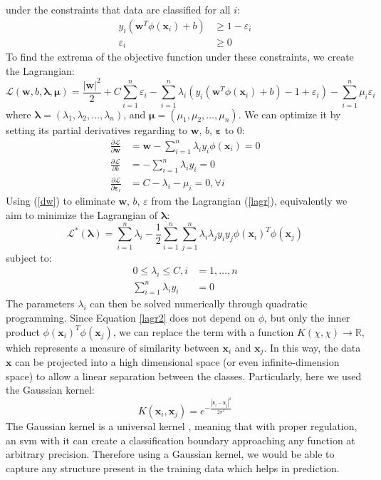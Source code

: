 under the constraints that data are classified for all $i$:
\begin{align*}
    y_i (\mathbf{w}^T\phi(\mathbf{x}_i) + b) &\geq 1 - \varepsilon_i \\ 
    \varepsilon_i &\geq 0
\end{align*}
To find the extrema of the objective function under these constraints, we create the Lagrangian:
\begin{equation} \label{lagr}
    \mathcal{L}(\mathbf{w}, b, \mathbf{\lambda}, \mathbf{\mu})=\frac{|\mathbf{w}|^2}{2} + C\sum_{i=1}^n\varepsilon_i - \sum_{i=1}^n \lambda_i(y_i(\mathbf{w}^T\phi(\mathbf{x}_i) + b) - 1 + \varepsilon_i) - \sum_{i=1}^n \mu_i\varepsilon_i
\end{equation}
where $\mathbf{\lambda}=(\lambda_1, \lambda_2, \ldots, \lambda_n)$, and $\mathbf{\mu}=(\mu_1, \mu_2, \ldots, \mu_n)$. We can optimize it by setting its partial derivatives regarding to $\mathbf{w}$, $b$, $\mathbf{\varepsilon}$ to 0:
\begin{align}\label{dw}
    \frac{\partial\mathcal{L}}{\partial\mathbf{w}} &= \mathbf{w} - \sum_{i=1}^n \lambda_i  y_i  \phi(\mathbf{x}_i) = 0 \nonumber\\ 
    \frac{\partial\mathcal{L}}{\partial{b}} &= - \sum_{i=1}^n \lambda_i y_i = 0 \\
    \frac{\partial\mathcal{L}}{\partial{\mathbf{\varepsilon}_i}} &= C - \lambda_i - \mu_i = 0, \forall i  \nonumber 
\end{align}
Using (\ref{dw}) to eliminate $\mathbf{w}$, $b$, $\varepsilon$ from the Lagrangian (\ref{lagr}), equivalently we aim to minimize the Lagrangian of $\mathbf{\lambda}$:
\begin{equation} \label{lagr2}
    \mathcal{L}^*(\mathbf{\lambda}) = \sum_{i=1}^{n} \lambda_i - \frac{1}{2}\sum_{i=1}^n \sum_{j=1}^n \lambda_i \lambda_j y_i y_j \phi(\mathbf{x}_i)^T\phi(\mathbf{x}_j)
\end{equation}
subject to:
\begin{align*}
    0 \leq \lambda_i \leq C, i &= 1,\ldots,n \\
    \sum_{i=1}^n \lambda_i y_i &= 0
\end{align*}
The parameters $\lambda_i$ can then be solved numerically through quadratic programming. Since Equation \ref{lagr2} does not depend on $\phi$, but only the inner product $\phi(\mathbf{x}_i)^T\phi(\mathbf{x}_j)$, we can replace the term with a function $K(\chi, \chi) \to \mathbb{R}$, which represents a measure of similarity between $\mathbf{x}_i$ and $ \mathbf{x}_j$. In this way, the data $\mathbf{x}$ can be projected into a high dimensional space (or even infinite-dimension space) to allow a linear separation between the classes. Particularly, here we used the Gaussian kernel:
\begin{equation*}
    K(\mathbf{x}_i, \mathbf{x}_j) = e^{-\frac{|\mathbf{x}_i - \mathbf{x}_j|^2}{2\sigma^2}}
\end{equation*}
The Gaussian kernel is a universal kernel \citep{park91}, meaning that with proper regulation, an \gls{svm} with it can create a classification boundary approaching any function at arbitrary precision. Therefore using a Gaussian kernel, we would be able to capture any structure present in the training data which helps in prediction.

